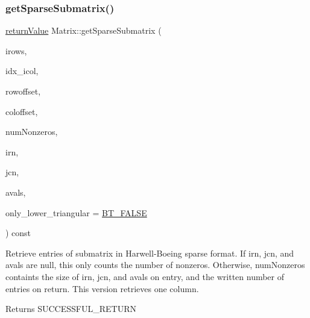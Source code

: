 \subsubsection{\texorpdfstring{get\+Sparse\+Submatrix()}{getSparseSubmatrix()}\hspace{0.1cm}{\footnotesize\ttfamily [2/4]}}
{\footnotesize\ttfamily \hyperlink{_message_handling_8hpp_a81d556f613bfbabd0b1f9488c0fa865e}{return\+Value} Matrix\+::get\+Sparse\+Submatrix (\begin{DoxyParamCaption}\item[{const \hyperlink{class_indexlist}{Indexlist} $\ast$const}]{irows,  }\item[{\hyperlink{_types_8hpp_ab6fd6105e64ed14a0c9281326f05e623}{int\+\_\+t}}]{idx\+\_\+icol,  }\item[{\hyperlink{_types_8hpp_ab6fd6105e64ed14a0c9281326f05e623}{int\+\_\+t}}]{rowoffset,  }\item[{\hyperlink{_types_8hpp_ab6fd6105e64ed14a0c9281326f05e623}{int\+\_\+t}}]{coloffset,  }\item[{\hyperlink{_types_8hpp_ab6fd6105e64ed14a0c9281326f05e623}{int\+\_\+t} \&}]{num\+Nonzeros,  }\item[{\hyperlink{_types_8hpp_ab6fd6105e64ed14a0c9281326f05e623}{int\+\_\+t} $\ast$}]{irn,  }\item[{\hyperlink{_types_8hpp_ab6fd6105e64ed14a0c9281326f05e623}{int\+\_\+t} $\ast$}]{jcn,  }\item[{\hyperlink{qp_o_a_s_e_s__wrapper_8h_a0d00e2b3dfadee81331bbb39068570c4}{real\+\_\+t} $\ast$}]{avals,  }\item[{\hyperlink{_types_8hpp_a20f82124c82b6f5686a7fce454ef9089}{Boolean\+Type}}]{only\+\_\+lower\+\_\+triangular = {\ttfamily \hyperlink{_types_8hpp_a20f82124c82b6f5686a7fce454ef9089a85b8a20e72a8bea5dd10a6007fe3071e}{B\+T\+\_\+\+F\+A\+L\+SE}} }\end{DoxyParamCaption}) const\hspace{0.3cm}{\ttfamily [virtual]}}

Retrieve entries of submatrix in Harwell-\/\+Boeing sparse format. If irn, jcn, and avals are null, this only counts the number of nonzeros. Otherwise, num\+Nonzeros containts the size of irn, jcn, and avals on entry, and the written number of entries on return. This version retrieves one column. \begin{DoxyReturn}{Returns}
S\+U\+C\+C\+E\+S\+S\+F\+U\+L\+\_\+\+R\+E\+T\+U\+RN 
\end{DoxyReturn}

